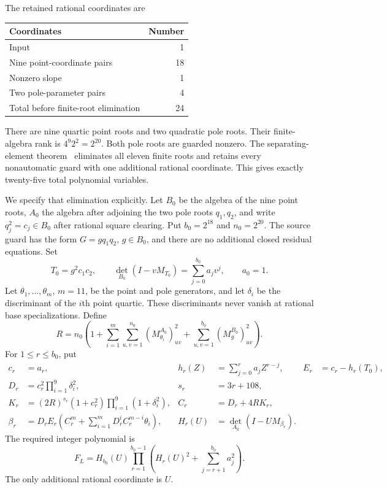 \documentclass[11pt,a4paper]{article}
\begin{document}
The retained rational coordinates are
\begin{center}
\begin{tabular}{lr}
\toprule
Coordinates & Number\\
\midrule
Input & 1\\
Nine point-coordinate pairs & 18\\
Nonzero slope & 1\\
Two pole-parameter pairs & 4\\
\midrule
Total before finite-root elimination & 24\\
\bottomrule
\end{tabular}
\end{center}
There are nine quartic point roots and two quadratic pole roots.
Their finite-algebra rank is $4^9 2^2=2^{20}$. Both pole roots
are guarded nonzero. The separating-element theorem~\cite{Active}
eliminates all eleven finite roots and retains every nonautomatic
guard with one additional rational coordinate. This gives exactly
twenty-five total polynomial variables.

We specify that elimination explicitly. Let $B_0$ be the algebra of
the nine point roots, $A_0$ the algebra after adjoining the two pole
roots $q_1,q_2$, and write $q_j^2=c_j\in B_0$ after rational
square clearing. Put $b_0=2^{18}$ and $n_0=2^{20}$. The source
guard has the form $G=gq_1q_2$, $g\in B_0$, and there are no
additional closed residual equations. Set
\[
 T_0=g^2c_1c_2,\qquad
 \det_{B_0}(I-vM_{T_0})=\sum_{j=0}^{b_0}a_jv^j,\qquad a_0=1.
\]
Let $\theta_1,\ldots,\theta_m$, $m=11$, be the point and pole
generators, and let $\delta_i$ be the discriminant of the $i$th
point quartic. These discriminants never vanish at rational base
specializations. Define
\[
 R=n_0\left(1+\sum_{i=1}^{m}\sum_{u,v=1}^{n_0}
              (M_{\theta_i}^{A_0})_{uv}^2
            +\sum_{u,v=1}^{b_0}(M_g^{B_0})_{uv}^2\right).
\]
For $1\le r\le b_0$, put
\begin{align*}
 c_r&=a_r,&h_r(Z)&=\sum_{j=0}^r a_jZ^{r-j},&E_r&=c_r-h_r(T_0),\\
 D_r&=c_r^2\prod_{i=1}^9\delta_i^2,&s_r&=3r+108,\\
 K_r&=(2R)^{s_r}(1+c_r^2)\prod_{i=1}^9(1+\delta_i^2),&
 C_r&=D_r+4RK_r,\\
 \beta_r&=D_rE_r\left(C_r^m+
             \sum_{i=1}^mD_r^iC_r^{m-i}\theta_i\right),&
 H_r(U)&=\det_{A_0}(I-UM_{\beta_r}).
\end{align*}
The required integer polynomial is
\begin{equation}\label{eq:finite-product}
 F_L=H_{b_0}(U)\prod_{r=1}^{b_0-1}
            \left(H_r(U)^2+\sum_{j=r+1}^{b_0}a_j^2\right).
\end{equation}
The only additional rational coordinate is $U$.
\end{document}
